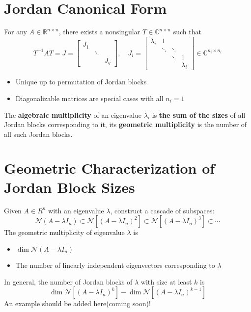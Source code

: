 \documentclass[10pt,a4paper,oneside]{article}
\begin{document}
\section{Jordan Canonical Form}
For any $A\in\mathbb{R}^{n\times n}$, there exists a nonsingular $T\in\mathbb{C}^{n\times n}$ such that
\[
T^{-1} A T=J=\left[\begin{array}{lll}{J_{1}} & {} & {} \\ {} & {\ddots} & {} \\ {} & {} & {J_{q}}\end{array}\right], \quad J_{i}=\left[\begin{array}{cccc}{\lambda_{i}} & {1} & {} & {} \\ {} & {\ddots} & {\ddots} & {} \\ {} & {} & {\ddots} & {1} \\ {} & {} & {} & {\lambda_{i}}\end{array}\right] \in \mathbb{C}^{n_{i} \times n_{i}}
\]
\begin{itemize}
\item Unique up to permutation of Jordan blocks
\item Diagonalizable matrices are special cases with all $n_i=1$
\end{itemize}
The \textbf{algebraic multiplicity} of an eigenvalue $\lambda_i$ is \textbf{the sum of the sizes} of all Jordan blocks corresponding to it, its \textbf{geometric multiplicity} is the number of all such Jordan blocks.
\section{Geometric Characterization of Jordan Block Sizes}
Given $A\in R^n$ with an eigenvalue $\lambda$, construct a cascade of subspaces:
\[
\mathcal{N}\left(A-\lambda I_{n}\right) \subset \mathcal{N}\left[\left(A-\lambda I_{n}\right)^{2} \right] \subset \mathcal{N}\left[(A-\lambda I_n)^{3}\right] \subset \cdots
\]
The geometric multiplicity of eigenvalue $\lambda$ is
\begin{itemize}
\item $\operatorname{dim} \mathcal{N}\left(A-\lambda I_{n}\right)$
\item The number of linearly independent eigenvectors corresponding to $\lambda$
\end{itemize}
In general, the number of Jordan blocks of $\lambda$ with size at least $k$ is
\[
\operatorname{dim} \mathcal{N} \left[\left(A-\lambda I_{n}\right)^{k}\right]-\operatorname{dim} \mathcal{N}\left[\left(A-\lambda I_{n}\right)^{k-1}\right]
\]
An example should be added here(coming soon)!
\end{document}

